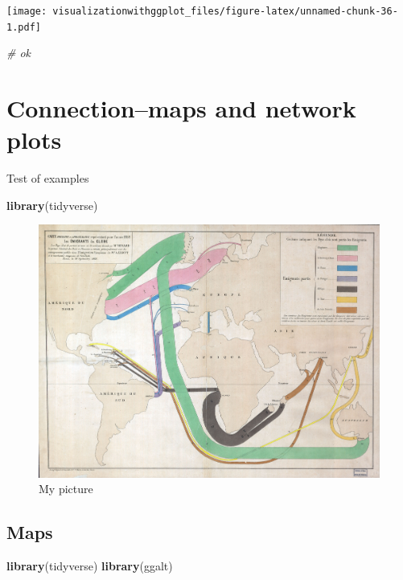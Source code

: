 \documentclass[]{krantz}
\makeatletter
\newenvironment{Shaded}{\begin{snugshade}}{\end{snugshade}}
\newcommand{\KeywordTok}[1]{\textcolor[rgb]{0.13,0.29,0.53}{\textbf{#1}}}
\newcommand{\CommentTok}[1]{\textcolor[rgb]{0.56,0.35,0.01}{\textit{#1}}}
\newcommand{\NormalTok}[1]{#1}
\newenvironment{kframe}{%
\medskip{}
\setlength{\fboxsep}{.8em}
 \def\at@end@of@kframe{}%
 \ifinner\ifhmode%
  \def\at@end@of@kframe{\end{minipage}}%
  \begin{minipage}{\columnwidth}%
 \fi\fi%
 \def\FrameCommand##1{\hskip\@totalleftmargin \hskip-\fboxsep
 \colorbox{shadecolor}{##1}\hskip-\fboxsep
     \hskip-\linewidth \hskip-\@totalleftmargin \hskip\columnwidth}%
 \MakeFramed {\advance\hsize-\width
   \@totalleftmargin\z@ \linewidth\hsize
   \@setminipage}}%
 {\par\unskip\endMakeFramed%
 \at@end@of@kframe}
\renewenvironment{Shaded}{\begin{kframe}}{\end{kframe}}
\theoremstyle{definition}
\theoremstyle{definition}
\theoremstyle{definition}
\theoremstyle{remark}
\makeatother
\begin{document}
\texttt{[image: visualizationwithggplot\_files/figure-latex/unnamed-chunk-36-1.pdf]}

\begin{Shaded}
\begin{Highlighting}[]
\CommentTok{# ok}
\end{Highlighting}
\end{Shaded}

\cleardoublepage 

\chapter{Connection--maps and network plots}\label{Connection}

Test of examples

\begin{Shaded}
\begin{Highlighting}[]
\KeywordTok{library}\NormalTok{(tidyverse)}
\end{Highlighting}
\end{Shaded}

\begin{figure}
\centering
\includegraphics{images/Minard_migration.jpg}
\caption{My picture}
\end{figure}

\section{Maps}\label{maps}

\begin{Shaded}
\begin{Highlighting}[]
\KeywordTok{library}\NormalTok{(tidyverse)}
\KeywordTok{library}\NormalTok{(ggalt)}
\end{Highlighting}
\end{Shaded}
\end{document}
